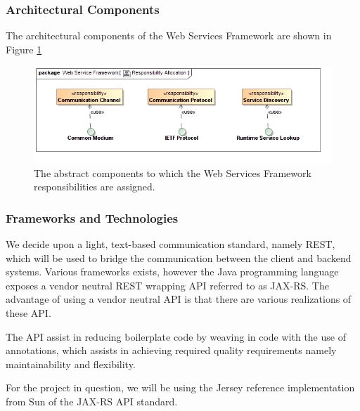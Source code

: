 \subsubsection{Architectural Components}
The architectural components of the Web Services Framework are shown in Figure \ref{fig:webServicesFrameworkResponsibilityAllocation}
\begin{figure}[H]
	\begin{center}
	\includegraphics[scale=0.5]{../Diagrams and Charts/Web Services Framework/ResponsibilityAllocation.jpg}
	\caption{The abstract components to which the Web Services Framework responsibilities are assigned.}
	\label{fig:webServicesFrameworkResponsibilityAllocation}
	\end{center}
\end{figure}

\subsubsection{Frameworks and Technologies}
We decide upon a light, text-based communication standard, namely REST, which
will be used to bridge the communication between the client and backend systems.
Various frameworks exists, however the Java programming language exposes a
vendor neutral REST wrapping API referred to as JAX-RS. The advantage of using a
vendor neutral API is that there are various realizations of these API.

The API assist in reducing boilerplate code by weaving in code with the use of
annotations, which assists in achieving required quality requirements namely
maintainability and flexibility.

For the project in question, we will be using the Jersey reference implementation
from Sun of the JAX-RS API standard.

